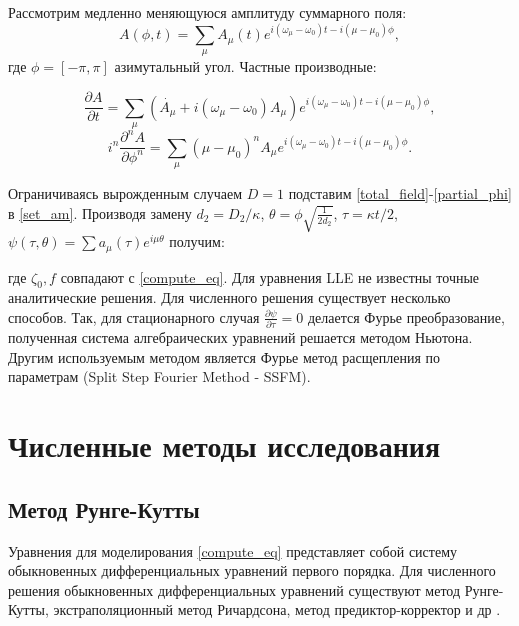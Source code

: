 Рассмотрим медленно меняющуюся амплитуду суммарного поля:
\begin{equation}\label{total_field}
A(\phi,t)=\sum_\mu A_\mu(t)e^{i(\omega_\mu-\omega_0)t-i(\mu-\mu_0)\phi},
\end{equation}
где $\phi=[-\pi,\pi]$ азимутальный угол. Частные производные:

\begin{equation}\label{partial_t}
\frac{\partial A}{\partial t}=\sum_\mu(\dot{A_\mu}+i(\omega_\mu-\omega_0)A_\mu)e^{i(\omega_\mu-\omega_0)t-i(\mu-\mu_0)\phi},
\end{equation}
\begin{equation}\label{partial_phi}
i^n\frac{\partial^n A}{\partial \phi^n}=\sum_\mu(\mu-\mu_0)^n A_\mu e^{i(\omega_\mu-\omega_0)t-i(\mu-\mu_0)\phi}.
\end{equation}

Ограничиваясь вырожденным случаем $D=1$ подставим \eqref{total_field}-\eqref{partial_phi} в \eqref{set_am}. Производя замену $d_2=D_2/\kappa$, $\theta=\phi\sqrt{\frac{1}{2d_2}}$, $\tau=\kappa t/2$, $\psi(\tau,\theta)=\sum a_\mu(\tau)e^{i\mu\theta}$ получим:


где $\zeta_0, f$ совпадают с \eqref{compute_eq}. Для уравнения LLE не известны точные аналитические решения. Для численного решения существует несколько способов. Так, для стационарного случая \cite{Akhmediev2005} $\frac{\partial \psi}{\partial \tau}=0$ делается Фурье преобразование, полученная система алгебраических уравнений решается методом Ньютона. Другим используемым методом является Фурье метод расщепления по параметрам (Split Step Fourier Method - SSFM).

\section{Численные методы исследования}

\subsection{Метод Рунге-Кутты}
Уравнения для моделирования \eqref{compute_eq} представляет собой систему обыкновенных дифференциальных уравнений первого порядка. Для численного решения обыкновенных дифференциальных уравнений существуют метод Рунге-Кутты, экстраполяционный метод Ричардсона, метод предиктор-корректор и др \cite{Press2002}.

